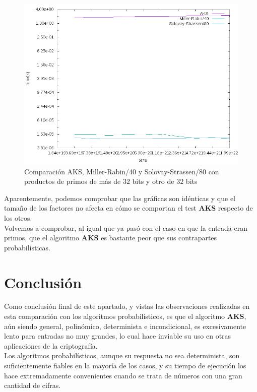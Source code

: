 \begin{figure}[H]
	\centering
	\includegraphics[totalheight=12cm]{img/graphs/aks-probs-comps-32-mean}
	\caption{Comparación AKS, Miller-Rabin/40 y Solovay-Strassen/80 con productos de primos de más de $32$ bits y otro de $32$ bits}
\end{figure}

Aparentemente, podemos comprobar que las gráficas son idénticas y que el tamaño de los factores no afecta en cómo se comportan el test \textbf{AKS} respecto de los otros.\\

Volvemos a comprobar, al igual que ya pasó con el caso en que la entrada eran primos, que el algoritmo \textbf{AKS} es bastante peor que sus contrapartes probabilísticas.

\section{Conclusión}

Como conclusión final de este apartado, y vistas las observaciones realizadas en esta comparación con los algoritmos probabilísticos, es que el algoritmo \textbf{AKS}, aún siendo general, polinómico, determinista e incondicional, es excesivamente lento para entradas no muy grandes, lo cual hace inviable su uso en otras aplicaciones de la criptografía.\\

Los algoritmos probabilísticos, aunque su respuesta no sea determinista, son suficientemente fiables en la mayoría de los casos, y su tiempo de ejecución los hace extremadamente convenientes cuando se trata de números con una gran cantidad de cifras.

\endinput
